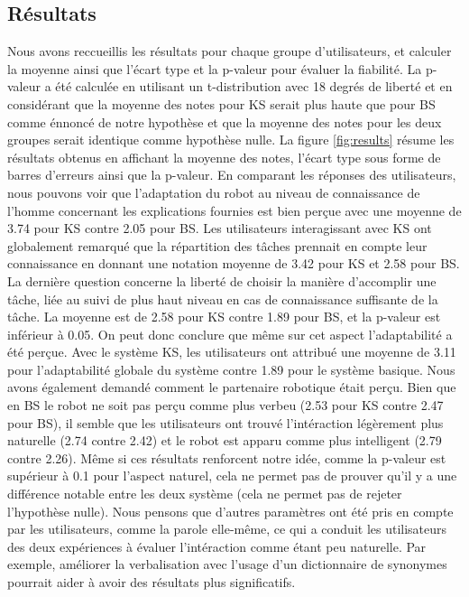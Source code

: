 \documentclass[a4paper,11pt,twoside]{StyleThese}
\begin{document}
\subsection{Résultats}

Nous avons reccueillis les résultats pour chaque groupe d'utilisateurs, et calculer la moyenne ainsi que l'écart type et la p-valeur pour évaluer la fiabilité. La p-valeur a été calculée en utilisant un t-distribution avec 18 degrés de liberté et en considérant que la moyenne des notes pour KS serait plus haute que pour BS comme énnoncé de notre hypothèse et que la moyenne des notes pour les deux groupes serait identique comme hypothèse nulle.
La figure \ref{fig:results} résume les résultats obtenus en affichant la moyenne des notes, l'écart type sous forme de barres d'erreurs ainsi que la p-valeur. En comparant les réponses des utilisateurs, nous pouvons voir que l'adaptation du robot au niveau de connaissance de l'homme concernant les explications fournies est bien perçue avec une moyenne de 3.74 pour KS contre 2.05 pour BS. Les utilisateurs interagissant avec KS ont globalement remarqué que la répartition des tâches prennait en compte leur connaissance en donnant une notation moyenne de 3.42 pour KS et 2.58 pour BS. La dernière question concerne la liberté de choisir la manière d'accomplir une tâche, liée au suivi de plus haut niveau en cas de connaissance suffisante de la tâche. La moyenne est de 2.58 pour KS contre 1.89 pour BS, et la p-valeur est inférieur à 0.05. On peut donc conclure que même sur cet aspect l'adaptabilité a été perçue.
Avec le système KS, les utilisateurs ont attribué une moyenne de 3.11 pour l'adaptabilité globale du système contre 1.89 pour le système basique.
Nous avons également demandé comment le partenaire robotique était perçu. Bien que en BS le robot ne soit pas perçu comme plus verbeu (2.53 pour KS contre 2.47 pour BS), il semble que les utilisateurs ont trouvé l'intéraction légèrement plus naturelle (2.74 contre 2.42) et le robot est apparu comme plus intelligent (2.79 contre 2.26). Même si ces résultats renforcent notre idée, comme la p-valeur est supérieur à 0.1 pour l'aspect naturel, cela ne permet pas de prouver qu'il y a une différence notable entre les deux système (cela ne permet pas de rejeter l'hypothèse nulle).
Nous pensons que d'autres paramètres ont été pris en compte par les utilisateurs, comme la parole elle-même, ce qui a conduit les utilisateurs des deux expériences à évaluer l'intéraction comme étant peu naturelle. Par exemple, améliorer la verbalisation avec l'usage d'un dictionnaire de synonymes pourrait aider à avoir des résultats plus significatifs.
\end{document}
